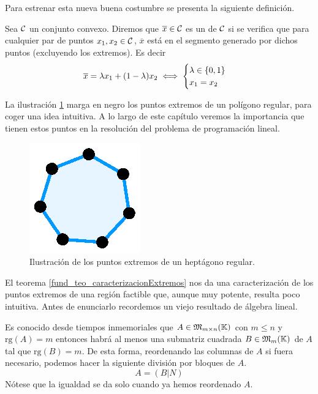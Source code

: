 Para estrenar esta nueva buena costumbre se presenta la siguiente definición.
\begin{defi}
	Sea $\mathcal{C}$ un conjunto convexo. Diremos que $\overline{x}\in\mathcal{C}$ es un  de $\mathcal{C}$ si se verifica que para cualquier par de puntos $x_1,x_2\in\mathcal{C}$, $\overline{x}$  está en el segmento generado por dichos puntos (excluyendo los extremos). Es decir
	\begin{equation*}
		\overline{x}=\lambda x_1+(1-\lambda)x_2\iff\begin{cases}
		\lambda\in\{0,1\}\\
		x_1=x_2
		\end{cases}
	\end{equation*}
\end{defi}
La ilustración \ref{fund_img_puntosExtremos} marga en negro los puntos extremos de un polígono regular, para coger una idea intuitiva. A lo largo de este capítulo veremos la importancia que tienen estos puntos en la resolución del problema de programación lineal.
\begin{figure}[h!]
	\centering
	\label{fund_img_puntosExtremos}
	\includegraphics[scale = 0.75]{img/puntosExtremos}
	\caption{Ilustración de los puntos extremos de un heptágono regular.}
\end{figure}
El teorema \ref{fund_teo_caracterizacionExtremos} nos da una caracterización de los puntos extremos de una región factible que, aunque muy potente, resulta poco intuitiva. Antes de enunciarlo recordemos un viejo resultado de álgebra lineal.
\begin{obs}
	\label{fund_obs_rango}
	Es conocido desde tiempos inmemoriales que $A\in\mathfrak{M}_{m\times n}(\mathbb{K})$ con $m\leq n$ y $\mathrm{rg}(A)=m$ entonces habrá al menos una submatriz cuadrada $B\in\mathfrak{M}_{m}(\mathbb{K})$ de $A$ tal que $\mathrm{rg}(B)=m$. De esta forma, reordenando las columnas de $A$ si fuera necesario, podemos hacer la siguiente división por bloques de $A$.
	\begin{equation*}
		A=(B|N)
	\end{equation*}
	Nótese que la igualdad se da solo cuando ya hemos reordenado $A$.
\end{obs}
